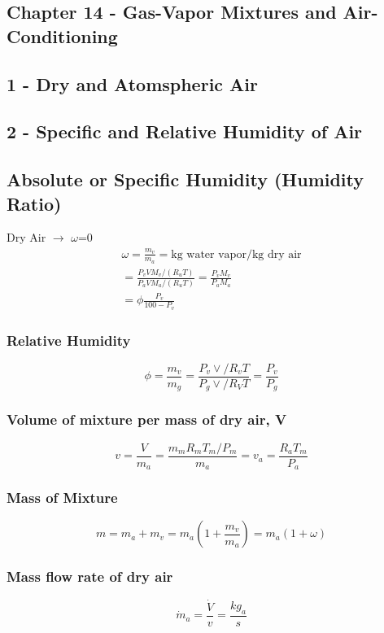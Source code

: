 \documentclass[10pt,landscape]{article}
\begin{document}
\begin{multicols}{3}
\section{Chapter 14 - Gas-Vapor Mixtures and Air-Conditioning}
\subsection{1 - Dry and Atomspheric Air}
\subsection{2 - Specific and Relative Humidity of Air}
\subsection{Absolute or Specific Humidity (Humidity Ratio)}
Dry Air $\rightarrow$ $\omega$=0
\begin{multline}
    \omega=\frac{m_v}{m_a}=\text{kg water vapor/kg dry air} \\
    =\frac{P_vVM_v/(R_uT)}{P_aVM_a/(R_uT)}=\frac{P_vM_v}{P_aM_a} \\
    = \phi\frac{P_v}{100-P_v}
\end{multline}
\subsubsection{Relative Humidity}
\begin{equation}
    \phi=\frac{m_v}{m_g}=\frac{P_v\vee/R_vT}{P_g\vee/R_VT}=\frac{P_v}{P_g}
\end{equation}
\subsubsection{Volume of mixture per mass of dry air, V}
\begin{equation}
    v=\frac{V}{m_a}=\frac{m_mR_mT_m/P_m}{m_a}=v_a=\frac{R_aT_m}{P_a}
\end{equation}
\subsubsection{Mass of Mixture}
\begin{equation}
    m=m_a+m_v=m_a(1+\frac{m_v}{m_a})=m_a(1+\omega)
\end{equation}
\subsubsection{Mass flow rate of dry air}
\begin{equation}
    \dot{m}_a=\frac{\dot{V}}{v}=\frac{kg_a}{s}
\end{equation}

\end{multicols}
\end{document}
